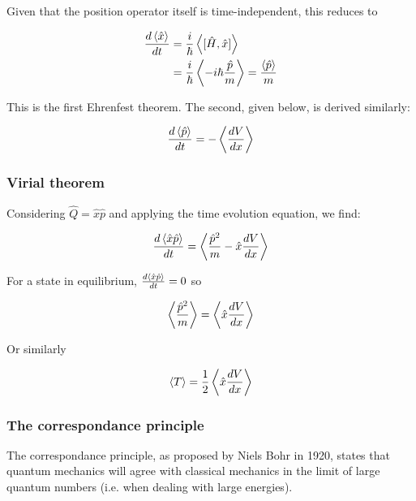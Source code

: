 Given that the position operator itself is time-independent, this reduces to

\begin{align*} 
	\frac{d\expval{\hat{x}}}{dt} &= \frac{i}{\hbar}\expval{[\hat{H}, \hat{x}]} \\
	&= \frac{i}{\hbar}\expval{-i\hbar\frac{\hat{p}}{m}} = \frac{\expval{\hat{p}}}{m}
\end{align*}

This is the first Ehrenfest theorem. The second, given below, is derived similarly:

\[ \frac{d\expval{\hat{p}}}{dt} = -\expval{\frac{dV}{dx}} \]

\subsubsection{Virial theorem}

Considering $\hat{Q} = \hat{x}\hat{p}$ and applying the time evolution equation, we find:

\[ \frac{d\expval{\hat{x}\hat{p}}}{dt} = \expval{\frac{\hat{p}^2}{m} - \hat{x}\frac{dV}{dx}} \]

For a state in equilibrium, $\frac{d\expval{\hat{x}\hat{p}}}{dt} = 0$ so

\[ \expval{\frac{\hat{p}^2}{m}} = \expval{\hat{x}\frac{dV}{dx}} \]

Or similarly

\[ \expval{T} = \frac{1}{2}\expval{\hat{x}\frac{dV}{dx}} \]

\subsubsection{The correspondance principle}

The correspondance principle, as proposed by Niels Bohr in 1920, states that quantum mechanics will agree with classical mechanics in the limit of large quantum numbers (i.e. when dealing with large energies). 